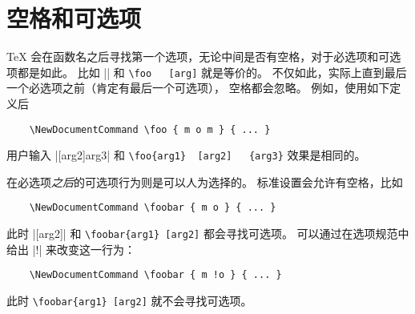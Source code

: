 \documentclass{l3doc}
\begin{document}
%
\section{空格和可选项}

%
\TeX{} 会在函数名之后寻找第一个选项，无论中间是否有空格，对于必选项和可选项都是如此。
比如 |\foo[arg]| 和 \verb*|\foo   [arg]| 就是等价的。
不仅如此，实际上直到最后一个必选项之前（肯定有最后一个可选项），
空格都会忽略。
例如，使用如下定义后
\begin{verbatim}
    \NewDocumentCommand \foo { m o m } { ... }
\end{verbatim}
用户输入 |[arg2]{arg3}| 和 \verb*|\foo{arg1}  [arg2]   {arg3}| 效果是相同的。

在必选项\emph{之后}的可选项行为则是可以人为选择的。
标准设置会允许有空格，比如
\begin{verbatim}
    \NewDocumentCommand \foobar { m o } { ... }
\end{verbatim}
%
此时 |[arg2]| 和 \verb*|\foobar{arg1} [arg2]| 都会寻找可选项。
可以通过在选项规范中给出 |!| 来改变这一行为：
\begin{verbatim}
    \NewDocumentCommand \foobar { m !o } { ... }
\end{verbatim}
此时 \verb*|\foobar{arg1} [arg2]| 就不会寻找可选项。
\end{document}
